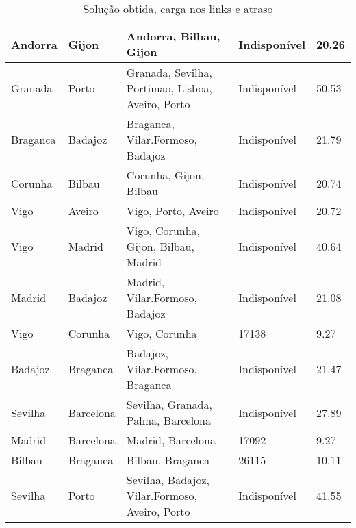 \begin{table}[!htb]
{\begin{tabular}{|l|l|l|l|l|}
Andorra & Gijon & Andorra, Bilbau, Gijon & Indisponível & 20.26 \\ \hline
Granada & Porto & Granada, Sevilha, Portimao, Lisboa, Aveiro, Porto & Indisponível & 50.53 \\ \hline
Braganca & Badajoz & Braganca, Vilar.Formoso, Badajoz & Indisponível & 21.79 \\ \hline
Corunha & Bilbau & Corunha, Gijon, Bilbau & Indisponível & 20.74 \\ \hline
Vigo & Aveiro & Vigo, Porto, Aveiro & Indisponível & 20.72 \\ \hline
Vigo & Madrid & Vigo, Corunha, Gijon, Bilbau, Madrid & Indisponível & 40.64 \\ \hline
Madrid & Badajoz & Madrid, Vilar.Formoso, Badajoz & Indisponível & 21.08 \\ \hline
Vigo & Corunha & Vigo, Corunha & 17138 & 9.27 \\ \hline
Badajoz & Braganca & Badajoz, Vilar.Formoso, Braganca & Indisponível & 21.47 \\ \hline
Sevilha & Barcelona & Sevilha, Granada, Palma, Barcelona & Indisponível & 27.89 \\ \hline
Madrid & Barcelona & Madrid, Barcelona & 17092 & 9.27 \\ \hline
Bilbau & Braganca & Bilbau, Braganca & 26115 & 10.11 \\ \hline
Sevilha & Porto & Sevilha, Badajoz, Vilar.Formoso, Aveiro, Porto & Indisponível & 41.55 \\ \hline
\end{tabular}}
\caption[]{Solução obtida, carga nos links e atraso}
\end{table}

